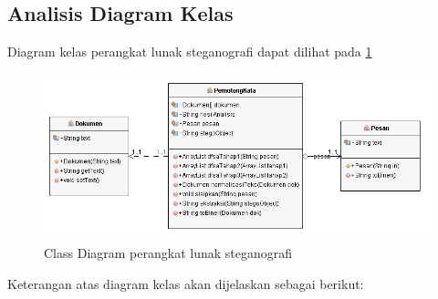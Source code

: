 \subsection{Analisis Diagram Kelas}

Diagram kelas perangkat lunak steganografi dapat dilihat pada \ref{fig:3_classdiagram}

\begin{figure}[H]
	\centering
	\includegraphics[scale=0.8]{Gambar/classdiagram}
	\caption{Class Diagram perangkat lunak steganografi} 
	\label{fig:3_classdiagram}
\end{figure}

Keterangan atas diagram kelas akan dijelaskan sebagai berikut:

